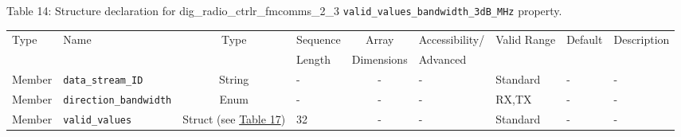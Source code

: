 \documentclass{article}
\def\comp{dig\_radio\_ctrlr\_fmcomms\_2\_3}
\begin{document}
\begin{landscape}
	\noindent Table \hypertarget{tab14}{14}: Structure declaration for \comp{} \verb+valid_values_bandwidth_3dB_MHz+ property.
	\begin{scriptsize}
		\noindent\begin{longtable}{|p{1.8cm}|p{3.6cm}|c|p{2cm}|c|p{2cm}|p{1.7cm}|p{0.8cm}|p{4.97cm}|}
			\hline
			\rowcolor{blue}
			Type         & Name                                & Type & Sequence & Array      & Accessibility/ & Valid Range  & Default & Description                                                                                                                                                                                                                       \\
			\rowcolor{blue}
			             &                                     &      & Length   & Dimensions & Advanced       &              &         &                                                                                                                                                                                                                             \\
			\hline
			Member       & \verb+data_stream_ID+               & String& -       & -          & -              & Standard     & -       & - \\
			\hline
			Member       & \verb+direction_bandwidth+          & Enum  & -       & -          & -              & RX,TX        & -       & - \\
			\hline
			Member       & \verb+valid_values+                 & Struct (see \hyperlink{tab17}{Table 17}) & 32      & -          & -              & Standard & -       & - \\
			\hline
		\end{longtable}
	\end{scriptsize}


\end{landscape}
\end{document}
